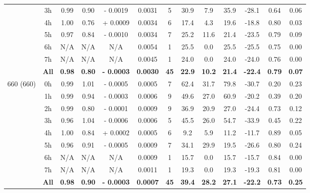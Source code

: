 \documentclass[onecolumn,3p,letterpaper,11pt]{elsarticle}
\begin{document}
\begin{table}[htbp!]
\begin{tabular}{ccccccccccccc}
 & 3h  & 0.99 & 0.90 & - 0.0019 & 0.0031 &  5 & 30.9 & 7.9 & 35.9 & -28.1 & 0.64 & 0.06 \\ 
 & 4h  & 1.00 & 0.76 & + 0.0009 & 0.0034 &  6 & 17.4 & 4.3 & 19.6 & -18.8 & 0.80 & 0.03 \\ 
 & 5h  & 0.97 & 0.84 & - 0.0010 & 0.0034 &  7 & 25.2 & 11.6 & 21.4 & -23.5 & 0.79 & 0.09 \\ 
 & 6h  & N/A & N/A & N/A & 0.0054 &  1 & 25.5 & 0.0 & 25.5 & -25.5 & 0.75 & 0.00\\ 
 & 7h  & N/A & N/A & N/A & 0.0045 &  1 & 24.0 & 0.0 & 24.0 & -24.0 & 0.76 & 0.00\\ \cline{2-13}
 & \textbf{All} & \textbf{0.98} & \textbf{0.80} & \textbf{- 0.0003} & \textbf{0.0030} & \textbf{45} & \textbf{22.9} & \textbf{10.2} & \textbf{21.4} & \textbf{-22.4} & \textbf{0.79} & \textbf{0.07} \\ \hline
\multirow{9}{*}{660 (660)} & 0h  & 0.99 & 1.01 & - 0.0005 & 0.0005 &  7 & 62.4 & 31.7 & 79.8 & -30.7 & 0.20 & 0.23 \\ 
 & 1h  & 0.99 & 0.94 & - 0.0003 & 0.0006 &  9 & 49.6 & 27.0 & 60.9 & -20.2 & 0.39 & 0.20 \\ 
 & 2h  & 0.99 & 0.80 & - 0.0001 & 0.0009 &  9 & 36.9 & 20.9 & 27.0 & -24.4 & 0.73 & 0.12 \\ 
 & 3h  & 0.96 & 1.04 & - 0.0006 & 0.0006 &  5 & 45.5 & 26.0 & 54.7 & -33.9 & 0.45 & 0.22 \\ 
 & 4h  & 1.00 & 0.84 & + 0.0002 & 0.0005 &  6 & 9.2 & 5.9 & 11.2 & -11.7 & 0.89 & 0.05 \\ 
 & 5h  & 0.96 & 0.91 & - 0.0005 & 0.0009 &  7 & 34.1 & 29.9 & 19.5 & -26.6 & 0.80 & 0.24 \\ 
 & 6h  & N/A & N/A & N/A & 0.0009 &  1 & 15.7 & 0.0 & 15.7 & -15.7 & 0.84 & 0.00\\ 
 & 7h  & N/A & N/A & N/A & 0.0011 &  1 & 19.3 & 0.0 & 19.3 & -19.3 & 0.81 & 0.00\\ \cline{2-13}
 & \textbf{All} & \textbf{0.98} & \textbf{0.90} & \textbf{- 0.0003} & \textbf{0.0007} & \textbf{45} & \textbf{39.4} & \textbf{28.2} & \textbf{27.1} & \textbf{-22.2} & \textbf{0.73} & \textbf{0.25} \\ 
\hline 
\end{tabular}
\end{table}
\end{document}
